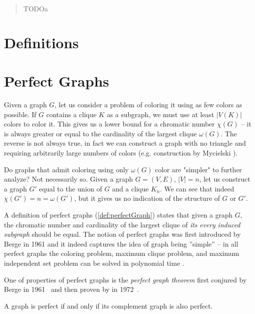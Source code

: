 \documentclass{article}
\author{Adrian Siwiec}
\date{\today{}}
\begin{document}

\pagebreak

\begin{abstract}
	TODOa
\end{abstract}

\listoftheorems[ignoreall,show={defn}]
\tableofcontents

\pagebreak

\section*{Definitions}


\section{Perfect Graphs}

Given a graph $G$, let us consider a problem of coloring it using as few colors as possible. If $G$ contains a clique $K$ as a subgraph, we must use at least $|V(K)|$ colors to color it. This gives us a lower bound for a chromatic number $\chi(G)$ -- it is always greater or equal to the cardinality of the largest clique $\omega(G)$. The reverse is not always true, in fact we can construct a graph with no triangle and requiring arbitrarily large numbers of colors (e.g. construction by Mycielski \cite{Mycielski1955}).

Do graphs that admit coloring using only $\omega(G)$ color are "simpler" to further analyze? Not necessarily so. Given a graph $G = (V, E)$, $|V| = n$, let us construct a graph $G'$ equal to the union of $G$ and a clique $K_n$. We can see that indeed $\chi(G') = n = \omega(G')$, but it gives us no indication of the structure of $G$ or $G'$.

A definition of perfect graphs (\cref{def:perfectGraph}) states that given a graph $G$, the chromatic number and cardinality of the largest clique of \emph{its every induced subgraph} should be equal. The notion of perfect graphs was first introduced by Berge in 1961 \cite{CB61} and it indeed captures the idea of graph being ''simple'' -- in all perfect graphs the coloring problem, maximum clique problem, and maximum independent set problem can be solved in polynomial time \cite{grotschel1993}.

One of properties of perfect graphs is the \emph{perfect graph theorem} first conjured by Berge in 1961~\cite{CB61} and then proven by \Lovasz in 1972~\cite{LL72}.

\begin{theorem}
	A graph is perfect if and only if its complement graph is also perfect. 
\end{theorem}
\end{document}
